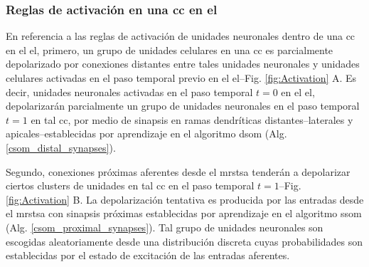 \subsubsection{Reglas de activación en una \gls{cc} en el }
\label{activation_rules}

En referencia a las reglas de activación de unidades neuronales dentro de una \gls{cc} en el \gls{el}, primero, un grupo de unidades celulares en una \gls{cc} es parcialmente depolarizado por conexiones distantes entre tales unidades neuronales y unidades celulares activadas en el paso temporal previo en el \gls{el}--Fig. \ref{fig:Activation} A. Es decir, unidades neuronales activadas en el paso temporal $t=0$ en el \gls{el}, depolarizarán parcialmente un grupo de unidades neuronales en el paso temporal $t=1$ en tal \gls{cc}, por medio de sinapsis en ramas dendríticas distantes--laterales y apicales--establecidas por aprendizaje en el algoritmo \gls{dsom} (Alg. \ref{csom_distal_synapses}).


Segundo, conexiones próximas aferentes desde el \gls{mrstsa} tenderán a depolarizar ciertos clusters de unidades en tal \gls{cc} en el paso temporal $t=1$--Fig. \ref{fig:Activation} B. La depolarización tentativa es producida por las entradas desde el \gls{mrstsa} con sinapsis próximas establecidas por aprendizaje en el algoritmo \gls{ssom} (Alg. \ref{csom_proximal_synapses}). Tal grupo de unidades neuronales son escogidas aleatoriamente desde una distribución discreta cuyas probabilidades son establecidas por el estado de excitación de las entradas aferentes. 


